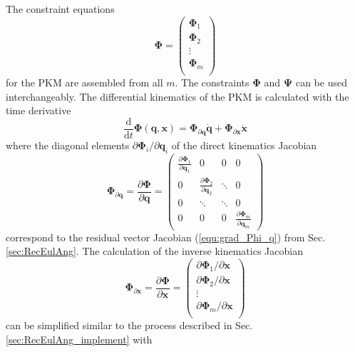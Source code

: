 \documentclass[twocolumn,10pt]{IFTOMM}
\newcommand{\bm}[1]{\boldsymbol{#1}}
\begin{document}
The constraint equations
%
\begin{equation}
\bm{\Phi}
=
\begin{pmatrix}
\bm{\Phi}_1 \\
\bm{\Phi}_2 \\
\vdots \\
\bm{\Phi}_m \\
\end{pmatrix}
\end{equation}
%
for the PKM are assembled from all $m$.
The constraints $\bm{\Phi}$ and $\bm{\Psi}$ can be used interchangeably.
The differential kinematics of the PKM is calculated with the time derivative
%
\begin{equation}
\frac{\mathrm{d}}{\mathrm{d}t} \bm{\Phi}(\bm{q},\bm{x})
=
\bm{\Phi}_{\partial \bm{q}}  \dot{\bm{q}}
+
\bm{\Phi}_{\partial \bm{x}} \dot{\bm{x}}
\end{equation}
%
where the diagonal elements $\partial \bm{\Phi}_i / \partial \bm{q}_i$ of the direct kinematics Jacobian
%
\begin{equation}
\bm{\Phi}_{\partial \bm{q}}
=
\frac{\partial \bm{\Phi}}{\partial \bm{q}}
=
\begin{pmatrix}
\frac{\partial \bm{\Phi}_1}{\partial \bm{q}_1}  & 0 & 0 & 0\\
0 & \frac{\partial \bm{\Phi}_2}{\partial \bm{q}_2} & \ddots & 0  \\
0 & \ddots & \ddots & 0  \\
0 & 0 & 0 &\frac{\partial \bm{\Phi}_m}{\partial \bm{q}_m}
\end{pmatrix}
\label{equ:PKM_phi_grad_q}
\end{equation}  
%
correspond to the residual vector Jacobian (\ref{equ:grad_Phi_q}) from Sec.\,\ref{sec:RecEulAng}.
The calculation of the inverse kinematics Jacobian
%
\begin{equation}
\bm{\Phi}_{\partial \bm{x}}
=
\frac{\partial \bm{\Phi}}{\partial \bm{x}}
=
\begin{pmatrix}
\partial \bm{\Phi}_1/\partial \bm{x}\\
\partial \bm{\Phi}_2/\partial \bm{x}\\
\vdots \\
\partial \bm{\Phi}_m/\partial \bm{x}\\
\end{pmatrix}
\label{equ:PKM_phi_grad_x}
\end{equation}  
%
can be simplified similar to the process described in Sec.\,\ref{sec:RecEulAng_implement} with
%
\end{document}
